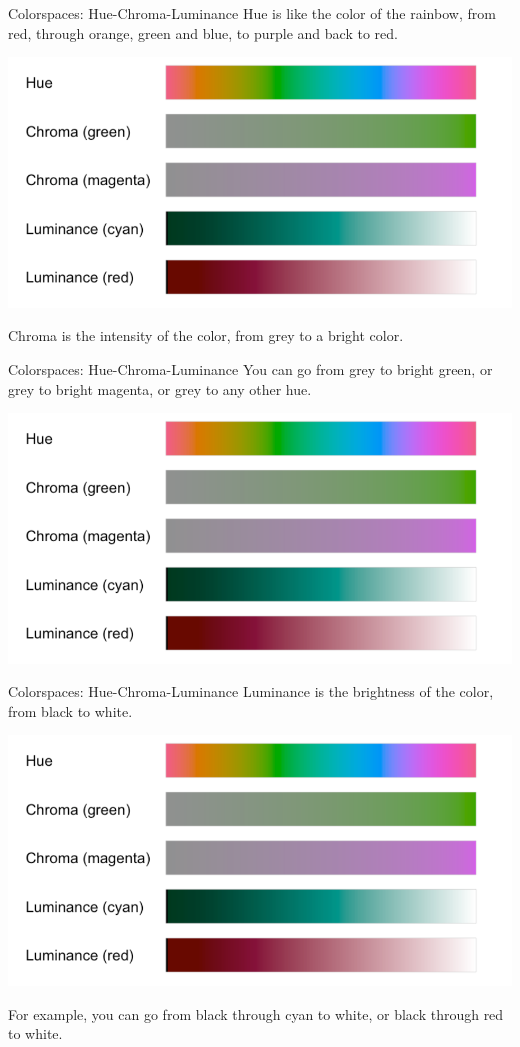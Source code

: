 \documentclass[
  ignorenonframetext,
]{beamer}
\begin{document}
\begin{frame}{Colorspaces: Hue-Chroma-Luminance}
\label{colorspaces-hue-chroma-luminance-1}
Hue is like the color of the rainbow, from red, through orange, green
and blue, to purple and back to red.

\includegraphics{../images/im80.png}

Chroma is the intensity of the color, from grey to a bright color.
\end{frame}

\begin{frame}{Colorspaces: Hue-Chroma-Luminance}
\label{colorspaces-hue-chroma-luminance-2}
You can go from grey to bright green, or grey to bright magenta, or grey
to any other hue.

\includegraphics{../images/im80.png}
\end{frame}

\begin{frame}{Colorspaces: Hue-Chroma-Luminance}
\label{colorspaces-hue-chroma-luminance-3}
Luminance is the brightness of the color, from black to white.

\includegraphics{../images/im80.png}

For example, you can go from black through cyan to white, or black
through red to white.
\end{frame}
\end{document}
